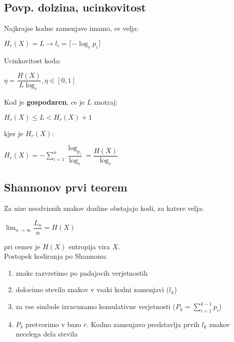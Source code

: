 \documentclass{article}
\begin{document}
\begin{multicols}{3}
\subsection{Povp. dolzina, ucinkovitost}
Najkrajse kodne zamenjave imamo, ce velja:
\begin{center}
    \begin{math}
        H_r(X) = L \rightarrow l_i = \lceil - \log_r p_i \rceil
    \end{math}
\end{center}
Ucinkovitost koda:
\begin{center}
    \begin{math}
        \eta = \dfrac{H(X)}{L \log_r}, \eta \in [0, 1]
    \end{math}
\end{center}
Kod je \textbf{gospodaren}, ce je $L$ znotraj:
\begin{center}
    \begin{math}
        H_r(X) \leq L < H_r(X) + 1
    \end{math}
\end{center}
kjer je $H_r(X)$:
\begin{center}
    \begin{math}
        H_r(X) = -\sum^{n}_{i=1} \dfrac{\log_{p_i}}{\log_r} = \dfrac{H(X)}{\log_r}
    \end{math}
\end{center}

\subsection{Shannonov prvi teorem}
Za nize neodvisnih znakov dozline  obstajajo kodi,
za katere velja:
\begin{center}
    \begin{math}
        \lim_{n \rightarrow \infty} \dfrac{L_n}{n} = H(X)
    \end{math}
\end{center}
pri cemer je $H(X)$ entropija vira $X$.\\
Postopek kodiranja po Shannonu:
\begin{enumerate}
    \item znake razvrstimo po padajocih verjetnostih
    \item dolocimo stevilo znakov v vsaki kodni zamenjavi ($l_k$)
    \item za vse simbole izracunamo komulativne verjetnosti ($P_k = \sum_{i=1}^{k-1} p_i$)
    \item $P_k$ pretvorimo v bazo $r$. Kodno zamenjavo predstavlja prvih $l_k$ znakov necelega dela stevila
\end{enumerate}


\end{multicols}
\end{document}
